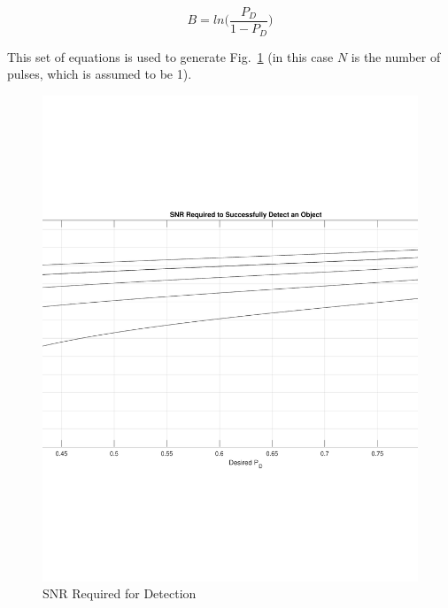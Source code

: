 \documentclass[11pt]{witseiepaper}
\begin{document}
\begin{bibunit}[witseie]
\begin{equation} \label{eqn:B}
B = ln \Bigg( \frac{P_D}{1 - P_D} \Bigg)
\end{equation}

This set of equations is used to generate Fig.~\ref{fig:SNRRequired} (in this case $N$ is the number of pulses, which is assumed to be 1).

\begin{center}
    \begin{figure}
        \includegraphics[width=\textwidth]{ProbabilityDetection.pdf}
        \caption{SNR Required for Detection}
        \label{fig:SNRRequired}    
    \end{figure}
\end{center}


\end{bibunit}
\end{document}
